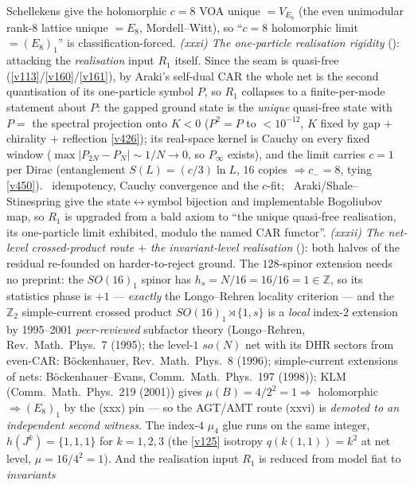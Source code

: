 \documentclass[11pt,a4paper]{article}
\newcommand{\Z}{\mathbb Z}
\begin{document}
\begin{keybox}
Schellekens give the holomorphic $c{=}8$ VOA unique $={}V_{E_8}$ (the even unimodular rank-$8$ lattice unique $={}E_8$,
Mordell--Witt), so ``$c{=}8$ holomorphic limit $={}(E_8)_1$'' is classification-forced. \emph{(xxxi) The one-particle
realisation rigidity} (): attacking the \emph{realisation} input $R_1$
itself. Since the seam is quasi-free (\vref{v113}/\vref{v160}/\vref{v161}), by Araki's self-dual CAR the whole net is
the second quantisation of its one-particle symbol $P$, so $R_1$ collapses to a finite-per-mode statement about $P$:
the gapped ground state is the \emph{unique} quasi-free state with $P{=}$ the spectral projection onto $K{<}0$
($P^2{=}P$ to $<10^{-12}$, $K$ fixed by gap $+$ chirality $+$ reflection \vref{v426}); its real-space kernel is Cauchy
on every fixed window ($\max|P_{2N}{-}P_N|{\sim}1/N{\to}0$, so $P_\infty$ exists), and the limit carries $c{=}1$ per
Dirac (entanglement $S(L){=}(c/3)\ln L$, $16$ copies $\Rightarrow c_-{=}8$, tying \vref{v450}). \mE\ idempotency,
Cauchy convergence and the $c$-fit; \mC\ Araki/Shale--Stinespring give the state$\leftrightarrow$symbol bijection and
implementable Bogoliubov map, so $R_1$ is upgraded from a bald axiom to ``the unique quasi-free realisation, its
one-particle limit exhibited, modulo the named CAR functor''. \emph{(xxxii) The net-level crossed-product route
$+$ the invariant-level realisation} (): both halves of the residual
re-founded on harder-to-reject ground. The $128$-spinor extension needs no preprint: the $SO(16)_1$ spinor has
$h_s{=}N/16{=}16/16{=}1{\in}\Z$, so its statistics phase is $+1$ --- \emph{exactly} the Longo--Rehren locality
criterion --- and the $\Z_2$ simple-current crossed product $SO(16)_1{\rtimes}\{1,s\}$ is a \emph{local} index-$2$
extension by 1995--2001 \emph{peer-reviewed} subfactor theory (Longo--Rehren, Rev.\ Math.\ Phys.\ 7 (1995); the
level-$1$ $so(N)$ net with its DHR sectors from even-CAR: B\"ockenhauer, Rev.\ Math.\ Phys.\ 8 (1996);
simple-current extensions of nets: B\"ockenhauer--Evans, Comm.\ Math.\ Phys.\ 197 (1998)); KLM (Comm.\ Math.\
Phys.\ 219 (2001)) gives $\mu(B){=}4/2^2{=}1\Rightarrow$ holomorphic $\Rightarrow(E_8)_1$ by the (xxx) pin ---
so the AGT/AMT route (xxvi) is \emph{demoted to an independent second witness}. The index-$4$ $\mu_4$ glue runs on
the same integer, $h(J^k){=}\{1,1,1\}$ for $k{=}1,2,3$ (the \vref{v125} isotropy $q(k(1,1)){=}k^2$ at net level,
$\mu{=}16/4^2{=}1$). And the realisation input $R_1$ is reduced from model fiat to \emph{invariants}

\end{keybox}
\end{document}
